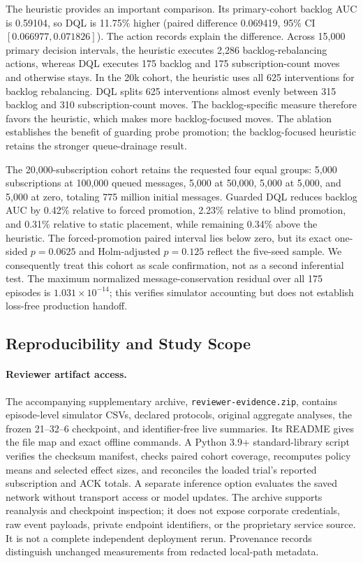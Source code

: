 The heuristic provides an important comparison. Its primary-cohort backlog AUC
is 0.59104, so DQL is 11.75\% higher (paired difference 0.069419, 95\% CI
$[0.066977,0.071826]$). The action records explain the difference. Across 15,000
primary decision intervals, the heuristic executes 2,286 backlog-rebalancing
actions, whereas DQL executes 175 backlog and 175 subscription-count moves and
otherwise stays. In the 20k cohort, the heuristic uses all 625 interventions for backlog rebalancing. DQL splits
625 interventions almost evenly between 315 backlog and 310 subscription-count moves. The backlog-specific measure therefore favors the heuristic, which makes
more backlog-focused moves.
The ablation establishes the benefit of guarding probe promotion; the
backlog-focused heuristic retains the stronger queue-drainage result.

The 20,000-subscription cohort retains the requested four equal groups:
5,000 subscriptions at 100,000 queued messages, 5,000 at 50,000, 5,000 at
5,000, and 5,000 at zero, totaling 775 million initial messages. Guarded DQL
reduces backlog AUC by 0.42\% relative to forced promotion, 2.23\% relative to
blind promotion, and 0.31\% relative to static placement, while remaining
0.34\% above the heuristic. The forced-promotion paired interval lies below
zero, but its exact one-sided $p=0.0625$ and Holm-adjusted $p=0.125$ reflect the
five-seed sample. We consequently treat this cohort as scale confirmation, not
as a second inferential test. The maximum normalized message-conservation
residual over all 175 episodes is $1.031\times10^{-14}$; this verifies simulator
accounting but does not establish loss-free production handoff.


\subsection{Reproducibility and Study Scope}

\paragraph{Reviewer artifact access.}
The accompanying supplementary archive, \texttt{reviewer-evidence.zip},
contains episode-level simulator CSVs, declared protocols, original aggregate
analyses, the frozen 21--32--6 checkpoint, and identifier-free live summaries.
Its README gives the file map and exact offline commands. A Python 3.9+
standard-library script verifies the checksum manifest, checks paired cohort
coverage, recomputes policy means and selected effect sizes, and reconciles
the loaded trial's reported subscription and ACK totals. A separate inference
option evaluates the saved network without transport access or model updates.
The archive supports reanalysis and checkpoint inspection; it does not expose
corporate credentials, raw event payloads, private endpoint identifiers, or
the proprietary service source. It is not a complete independent deployment
rerun. Provenance records distinguish unchanged measurements from redacted
local-path metadata.

